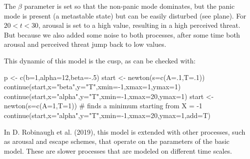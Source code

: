 \documentclass[
  letterpaper,
]{scrbook}
\newenvironment{Shaded}{\begin{snugshade}}{\end{snugshade}}
\newcommand{\AttributeTok}[1]{\textcolor[rgb]{0.40,0.45,0.13}{#1}}
\newcommand{\CommentTok}[1]{\textcolor[rgb]{0.37,0.37,0.37}{#1}}
\newcommand{\DecValTok}[1]{\textcolor[rgb]{0.68,0.00,0.00}{#1}}
\newcommand{\FunctionTok}[1]{\textcolor[rgb]{0.28,0.35,0.67}{#1}}
\newcommand{\NormalTok}[1]{\textcolor[rgb]{0.00,0.23,0.31}{#1}}
\newcommand{\OtherTok}[1]{\textcolor[rgb]{0.00,0.23,0.31}{#1}}
\newcommand{\SpecialCharTok}[1]{\textcolor[rgb]{0.37,0.37,0.37}{#1}}
\newcommand{\StringTok}[1]{\textcolor[rgb]{0.13,0.47,0.30}{#1}}
\begin{document}
The \(\beta\) parameter is set so that the non-panic mode dominates, but
the panic mode is present (a metastable state) but can be easily
disturbed (see plane). For \(20 < t < 30\), arousal is set to a high
value, resulting in a high perceived threat. But because we also added
some noise to both processes, after some time both arousal and perceived
threat jump back to low values.

This dynamic of this model is the cusp, as can be checked with:

\begin{Shaded}
\begin{Highlighting}[]
\NormalTok{p }\OtherTok{\textless{}{-}} \FunctionTok{c}\NormalTok{(}\AttributeTok{b=}\DecValTok{1}\NormalTok{,}\AttributeTok{alpha=}\DecValTok{12}\NormalTok{,}\AttributeTok{beta=}\SpecialCharTok{{-}}\NormalTok{.}\DecValTok{5}\NormalTok{)}
\NormalTok{start }\OtherTok{\textless{}{-}} \FunctionTok{newton}\NormalTok{(}\AttributeTok{s=}\FunctionTok{c}\NormalTok{(}\AttributeTok{A=}\NormalTok{.}\DecValTok{1}\NormalTok{,}\AttributeTok{T=}\NormalTok{.}\DecValTok{1}\NormalTok{)) }
\FunctionTok{continue}\NormalTok{(start,}\AttributeTok{x=}\StringTok{"beta"}\NormalTok{,}\AttributeTok{y=}\StringTok{"T"}\NormalTok{,}\AttributeTok{xmin=}\SpecialCharTok{{-}}\DecValTok{1}\NormalTok{,}\AttributeTok{xmax=}\DecValTok{1}\NormalTok{,}\AttributeTok{ymax=}\DecValTok{1}\NormalTok{) }
\FunctionTok{continue}\NormalTok{(start,}\AttributeTok{x=}\StringTok{"alpha"}\NormalTok{,}\AttributeTok{y=}\StringTok{"T"}\NormalTok{,}\AttributeTok{xmin=}\SpecialCharTok{{-}}\DecValTok{1}\NormalTok{,}\AttributeTok{xmax=}\DecValTok{20}\NormalTok{,}\AttributeTok{ymax=}\DecValTok{1}\NormalTok{) }
\NormalTok{start }\OtherTok{\textless{}{-}} \FunctionTok{newton}\NormalTok{(}\AttributeTok{s=}\FunctionTok{c}\NormalTok{(}\AttributeTok{A=}\DecValTok{1}\NormalTok{,}\AttributeTok{T=}\DecValTok{1}\NormalTok{)) }\CommentTok{\# finds a minimum starting from X = {-}1}
\FunctionTok{continue}\NormalTok{(start,}\AttributeTok{x=}\StringTok{"alpha"}\NormalTok{,}\AttributeTok{y=}\StringTok{"T"}\NormalTok{,}\AttributeTok{xmin=}\SpecialCharTok{{-}}\DecValTok{1}\NormalTok{,}\AttributeTok{xmax=}\DecValTok{20}\NormalTok{,}\AttributeTok{ymax=}\DecValTok{1}\NormalTok{,}\AttributeTok{add=}\NormalTok{T) }
\end{Highlighting}
\end{Shaded}

In D. Robinaugh et al. (2019), this model is extended with other
processes, such as arousal and escape schemes, that operate on the
parameters of the basic model. These are slower processes that are
modeled on different time scales.
\end{document}
